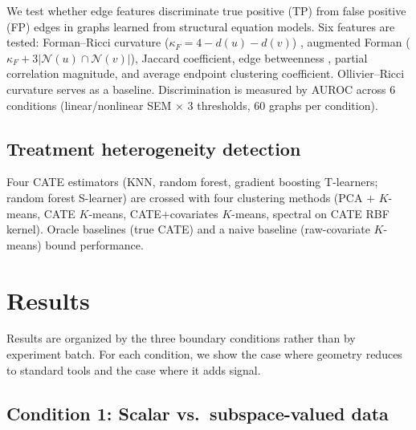 \documentclass[11pt]{article}
\begin{document}
We test whether edge features discriminate true positive (TP) from false positive (FP) edges in graphs learned from structural equation models.
Six features are tested: Forman--Ricci curvature ($\kappa_F = 4 - d(u) - d(v)$) \citep{forman2003bochner}, augmented Forman ($\kappa_F + 3|\mathcal{N}(u) \cap \mathcal{N}(v)|$), Jaccard coefficient, edge betweenness \citep{girvan2002community}, partial correlation magnitude, and average endpoint clustering coefficient.
Ollivier--Ricci curvature \citep{ollivier2009ricci, ni2019community} serves as a baseline.
Discrimination is measured by AUROC across 6 conditions (linear/nonlinear SEM $\times$ 3 thresholds, 60 graphs per condition).

\subsection{Treatment heterogeneity detection}
\label{sec:meth-hte}

Four CATE estimators (KNN, random forest, gradient boosting T-learners; random forest S-learner) are crossed with four clustering methods (PCA $+$ $K$-means, CATE $K$-means, CATE$+$covariates $K$-means, spectral on CATE RBF kernel).
Oracle baselines (true CATE) and a naive baseline (raw-covariate $K$-means) bound performance.

\section{Results}
\label{sec:results}

Results are organized by the three boundary conditions rather than by experiment batch.
For each condition, we show the case where geometry reduces to standard tools and the case where it adds signal.

\subsection{Condition 1: Scalar vs.\ subspace-valued data}
\label{sec:ms}
\label{sec:res-scalar-vs-subspace}
\end{document}
